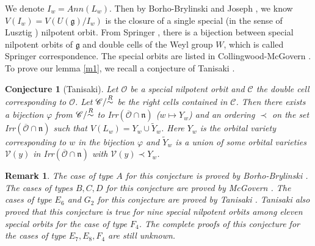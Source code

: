\documentclass{amsart}[12pt]
\newtheorem{Rem}{Remark}[section]
\newtheorem{Con}{Conjecture}[section]
\numberwithin{equation}{section}
\begin{document}
We denote $I_w=Ann(L_w)$. Then by Borho-Brylinski \cite{BoB1} and Joseph \cite{Jo85}, we know $V(I_w)=V(U(\mathfrak{g})/I_w)$ is the closure of a single special (in the sense of Lusztig \cite{Lu79}) nilpotent orbit. From Springer \cite{Sp}, there is a bijection between special nilpotent orbits of $\mathfrak{g}$ and double cells of the Weyl group $W$, which is called Springer correspondence. The special orbits are listed in Collingwood-McGovern \cite{CM}.
To prove our lemma \ref{m1}, we recall a conjecture of Tanisaki \cite{Ta}.
\begin{Con}[Tanisaki]\label{Ta}
Let $\mathcal{O}$ be a special nilpotent orbit and $\mathscr{C}$  the double cell corresponding to $\mathcal{O}$. Let $\mathscr{C}/ {\small \stackrel{R}{\sim}}$ be the right cells contained in $\mathscr{C}$. Then there exists a bijection $\varphi$ from $\mathscr{C}/ {\small \stackrel{R}{\sim}}$ to Irr$(\overline{\mathcal{O}}\cap \mathfrak{n})$ ($w\mapsto Y_w$) and an ordering $\prec$ on the set Irr$(\overline{\mathcal{O}}\cap \mathfrak{n})$ such that $V(L_w)=Y_w \cup \widetilde{Y}_w$. Here $Y_w$ is the orbital variety corresponding to $w$ in the bijection $\varphi$ and $\widetilde{Y}_w$ is a union of some orbital varieties $\mathcal{V}(y)$ in Irr$(\overline{\mathcal{O}}\cap \mathfrak{n})$  with $\mathcal{V}(y)\prec Y_w$.
\end{Con}

\begin{Rem}
The case of type $A$  for this conjecture is proved by Borho-Brylinski \cite{BoB3}. The  cases of types $B, C, D$ for this conjecture are proved by McGovern \cite{Mc}. The cases of type $E_6$ and $G_2$ for this conjecture are proved by Tanisaki \cite{Ta}. Tanisaki \cite{Ta} also proved that this conjecture is true for nine special nilpotent orbits among eleven special orbits for the case of type $F_4$.  The complete proofs of this conjecture for the cases of type $E_7, E_8, F_4$ are still unknown.
\end{Rem}
\end{document}
